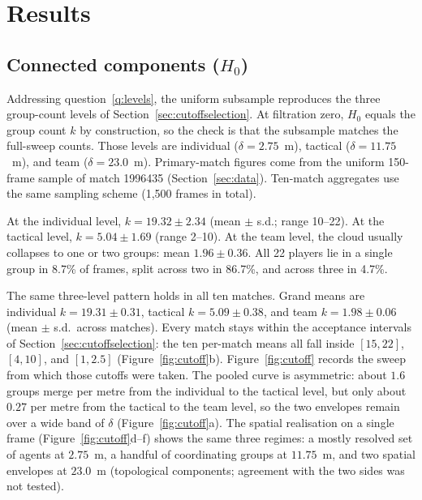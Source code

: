 \section{Results}

\subsection{Connected components (\texorpdfstring{$H_0$}{})}
\label{sec:scaleh0}

Addressing question~\ref{q:levels}, the uniform subsample reproduces
the three group-count levels of Section~\ref{sec:cutoffselection}.
At filtration zero, $H_0$ equals the group count $k$ by construction,
so the check is that the subsample matches the full-sweep counts.
Those levels are individual
($\delta = 2.75$~m), tactical ($\delta = 11.75$~m), and team
($\delta = 23.0$~m). Primary-match figures come from the uniform
150-frame sample of match 1996435 (Section~\ref{sec:data}).
Ten-match aggregates use the same sampling scheme (1{,}500 frames in
total).

At the individual level,
$k = 19.32 \pm 2.34$ (mean $\pm$ s.d.; range 10--22). At the tactical
level, $k = 5.04 \pm 1.69$ (range 2--10). At the
team level, the cloud usually collapses to one or
two groups: mean $1.96 \pm 0.36$. All 22 players lie in a single
group in 8.7\% of frames, split across two in 86.7\%, and across
three in 4.7\%.

The same three-level pattern holds in all ten matches. Grand means are
individual $k = 19.31 \pm 0.31$, tactical $k = 5.09 \pm 0.38$, and
team $k = 1.98 \pm 0.06$ (mean $\pm$ s.d.\ across matches).
Every match stays within the acceptance intervals of
Section~\ref{sec:cutoffselection}: the ten per-match means all fall
inside $[15,22]$, $[4,10]$, and $[1,2.5]$
(Figure~\ref{fig:cutoff}b). Figure~\ref{fig:cutoff} records the sweep
from which those cutoffs were taken. The pooled curve is asymmetric:
about $1.6$ groups merge per metre from the individual to the
tactical level, but only about $0.27$ per metre from the tactical to
the team level, so the two envelopes remain over a wide band
of $\delta$ (Figure~\ref{fig:cutoff}a). The spatial realisation on a
single frame (Figure~\ref{fig:cutoff}d--f) shows the same three
regimes: a mostly resolved set of agents at $2.75$~m, a handful of
coordinating groups at $11.75$~m, and two spatial envelopes at
$23.0$~m (topological components; agreement with the two sides was not
tested).

